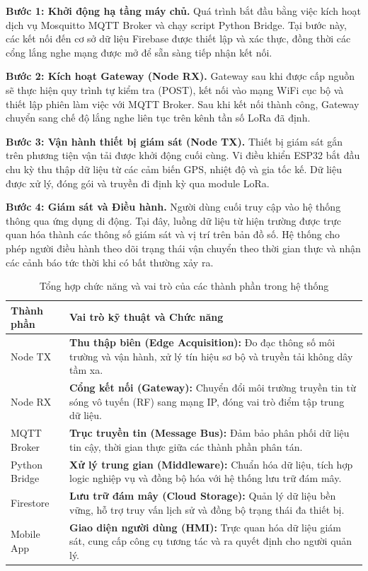 \textbf{Bước 1: Khởi động hạ tầng máy chủ.}
Quá trình bắt đầu bằng việc kích hoạt dịch vụ Mosquitto MQTT Broker và chạy script Python Bridge. Tại bước này, các kết nối đến cơ sở dữ liệu Firebase được thiết lập và xác thực, đồng thời các cổng lắng nghe mạng được mở để sẵn sàng tiếp nhận kết nối.

\textbf{Bước 2: Kích hoạt Gateway (Node RX).}
Gateway sau khi được cấp nguồn sẽ thực hiện quy trình tự kiểm tra (POST), kết nối vào mạng WiFi cục bộ và thiết lập phiên làm việc với MQTT Broker. Sau khi kết nối thành công, Gateway chuyển sang chế độ lắng nghe liên tục trên kênh tần số LoRa đã định.

\textbf{Bước 3: Vận hành thiết bị giám sát (Node TX).}
Thiết bị giám sát gắn trên phương tiện vận tải được khởi động cuối cùng. Vi điều khiển ESP32 bắt đầu chu kỳ thu thập dữ liệu từ các cảm biến GPS, nhiệt độ và gia tốc kế. Dữ liệu được xử lý, đóng gói và truyền đi định kỳ qua module LoRa.

\textbf{Bước 4: Giám sát và Điều hành.}
Người dùng cuối truy cập vào hệ thống thông qua ứng dụng di động. Tại đây, luồng dữ liệu từ hiện trường được trực quan hóa thành các thông số giám sát và vị trí trên bản đồ số. Hệ thống cho phép người điều hành theo dõi trạng thái vận chuyển theo thời gian thực và nhận các cảnh báo tức thời khi có bất thường xảy ra.

\begin{table}[H]
    \centering
    \begin{tabular}{|l|p{10cm}|}
        \hline
        \textbf{Thành phần} & \textbf{Vai trò kỹ thuật và Chức năng} \\ \hline
        Node TX & \textbf{Thu thập biên (Edge Acquisition):} Đo đạc thông số môi trường và vận hành, xử lý tín hiệu sơ bộ và truyền tải không dây tầm xa. \\ \hline
        Node RX & \textbf{Cổng kết nối (Gateway):} Chuyển đổi môi trường truyền tin từ sóng vô tuyến (RF) sang mạng IP, đóng vai trò điểm tập trung dữ liệu. \\ \hline
        MQTT Broker & \textbf{Trục truyền tin (Message Bus):} Đảm bảo phân phối dữ liệu tin cậy, thời gian thực giữa các thành phần phân tán. \\ \hline
        Python Bridge & \textbf{Xử lý trung gian (Middleware):} Chuẩn hóa dữ liệu, tích hợp logic nghiệp vụ và đồng bộ hóa với hệ thống lưu trữ đám mây. \\ \hline
        Firestore & \textbf{Lưu trữ đám mây (Cloud Storage):} Quản lý dữ liệu bền vững, hỗ trợ truy vấn lịch sử và đồng bộ trạng thái đa thiết bị. \\ \hline
        Mobile App & \textbf{Giao diện người dùng (HMI):} Trực quan hóa dữ liệu giám sát, cung cấp công cụ tương tác và ra quyết định cho người quản lý. \\ \hline
    \end{tabular}
    \caption{Tổng hợp chức năng và vai trò của các thành phần trong hệ thống}
    \label{tab:system_components}
\end{table}
